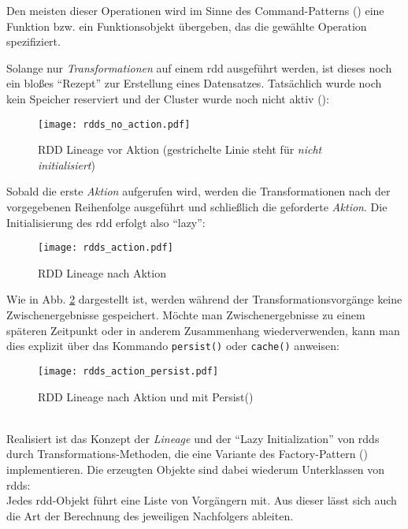 Den meisten dieser Operationen wird im Sinne des Command-Patterns (\cite{FPP13}) eine Funktion bzw. ein Funktionsobjekt übergeben, das die gewählte Operation spezifiziert.

Solange nur \textit{Transformationen} auf einem \gls{rdd} ausgeführt werden, ist dieses noch ein bloßes "`Rezept"' zur Erstellung eines Datensatzes. Tatsächlich wurde noch kein Speicher reserviert und der Cluster wurde noch nicht aktiv (\cite{Mat12}):\\

\begin{figure}[ht!]
	\centering
  \texttt{[image: rdds\_no\_action.pdf]}
	\caption{RDD Lineage vor Aktion (gestrichelte Linie steht für \textit{nicht initialisiert})}
	\label{fig:rdds_no_action}
\end{figure}

Sobald die erste \textit{Aktion} aufgerufen wird, werden die Transformationen nach der vorgegebenen Reihenfolge ausgeführt und schließlich die geforderte \textit{Aktion}. Die Initialisierung des \gls{rdd} erfolgt also "`lazy"':\\

\begin{figure}[ht!]
	\centering
  \texttt{[image: rdds\_action.pdf]}
	\caption{RDD Lineage nach Aktion}
	\label{fig:rdds_action}
\end{figure}

Wie in Abb. \ref{fig:rdds_action} dargestellt ist, werden während der Transformationsvorgänge keine Zwischenergebnisse gespeichert. Möchte man Zwischenergebnisse zu einem späteren Zeitpunkt oder in anderem Zusammenhang wiederverwenden, kann man dies explizit über das Kommando \lstinline|persist()| oder \lstinline|cache()| anweisen:\\

\begin{figure}[ht!]
	\centering
  \texttt{[image: rdds\_action\_persist.pdf]}
	\caption{RDD Lineage nach Aktion und mit Persist()}
	\label{fig:rdds_action_persist}
\end{figure}
\\
Realisiert ist das Konzept der \textit{Lineage} und der "`Lazy Initialization"' von \glspl{rdd} durch Transformations-Methoden, die eine Variante des Factory-Pattern (\cite{FPP13}) implementieren. Die erzeugten Objekte sind dabei wiederum Unterklassen von \gls{rdd}s:\\
Jedes \gls{rdd}-Objekt führt eine Liste von Vorgängern mit. Aus dieser lässt sich auch die Art der Berechnung des jeweiligen Nachfolgers ableiten.\\

